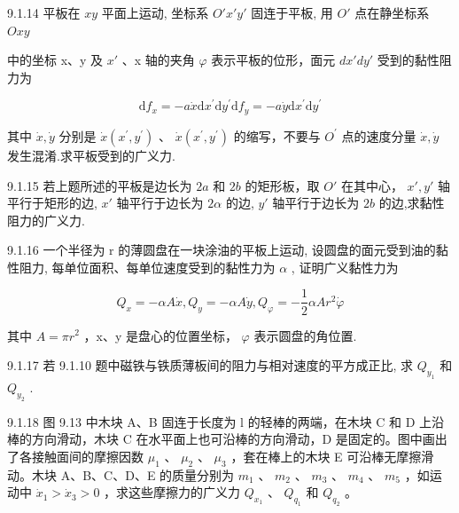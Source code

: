 \begin{problem}{9.1.14}
平板在 $xy$ 平面上运动, 坐标系 $O'x'y'$ 固连于平板, 用 $O'$ 点在静坐标系 $Oxy$ 

中的坐标 x、y 及 $x'$ 、x 轴的夹角 $\varphi$ 表示平板的位形，面元 $dx'dy'$ 受到的黏性阻力为

\[
\mathrm{d} f _ {x} = - a \dot {x} \mathrm{d} x ^ {\prime} \mathrm{d} y ^ {\prime} \mathrm{d} f _ {y} = - a \dot {y} \mathrm{d} x ^ {\prime} \mathrm{d} y ^ {\prime}
\]

其中 $\dot{x},\dot{y}$ 分别是 $\dot{x} (x^{\prime},y^{\prime})$ 、 $\dot{x} (x^{\prime},y^{\prime})$ 的缩写，不要与 $O^{\prime}$ 点的速度分量 $\dot{x},\dot{y}$ 发生混淆.求平板受到的广义力.
\end{problem}
\clearpage


\begin{problem}{9.1.15}
若上题所述的平板是边长为 $2a$ 和 $2b$ 的矩形板，取 $O'$ 在其中心， $x', y'$ 轴平行于矩形的边, $x'$ 轴平行于边长为 $2\alpha$ 的边, $y'$ 轴平行于边长为 $2b$ 的边,求黏性阻力的广义力.
\end{problem}
\clearpage


\begin{problem}{9.1.16}
一个半径为 r 的薄圆盘在一块涂油的平板上运动, 设圆盘的面元受到油的黏性阻力, 每单位面积、每单位速度受到的黏性力为 $\alpha$ , 证明广义黏性力为

\[
Q _ {x} = - \alpha A \dot {x}, Q _ {y} = - \alpha A \dot {y}, Q _ {\varphi} = - \frac {1}{2} \alpha A r ^ {2} \dot {\varphi}
\]

其中 $A=\pi r^{2}$ ，x、y 是盘心的位置坐标， $\varphi$ 表示圆盘的角位置.
\end{problem}
\clearpage


\begin{problem}{9.1.17}
若 9.1.10 题中磁铁与铁质薄板间的阻力与相对速度的平方成正比, 求 $Q_{y_1}$ 和 $Q_{y_2}$ .
\end{problem}
\clearpage


\begin{problem}{9.1.18}
图 9.13 中木块 A、B 固连于长度为 l 的轻棒的两端，在木块 C 和 D 上沿棒的方向滑动，木块 C 在水平面上也可沿棒的方向滑动，D 是固定的。图中画出了各接触面间的摩擦因数 $\mu_{1}$ 、 $\mu_{2}$ 、 $\mu_{3}$ ，套在棒上的木块 E 可沿棒无摩擦滑动。木块 A、B、C、D、E 的质量分别为 $m_{1}$ 、 $m_{2}$ 、 $m_{3}$ 、 $m_{4}$ 、 $m_{5}$ ，如运动中 $\dot{x}_{1} > \dot{x}_{3} > 0$ ，求这些摩擦力的广义力 $Q_{x_{1}}$ 、 $Q_{q_{1}}$ 和 $Q_{q_{2}}$ 。
\begin{center}

\end{center}
\end{problem}
\clearpage


